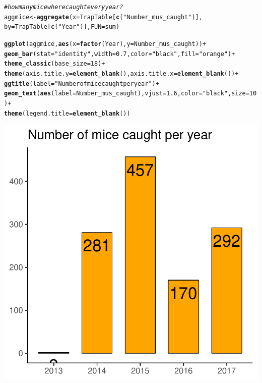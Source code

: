 \documentclass{article}\usepackage[]{graphicx}\usepackage[]{color}
\makeatletter
\newcommand{\hlnum}[1]{\textcolor[rgb]{0.686,0.059,0.569}{#1}}%
\newcommand{\hlstr}[1]{\textcolor[rgb]{0.192,0.494,0.8}{#1}}%
\newcommand{\hlcom}[1]{\textcolor[rgb]{0.678,0.584,0.686}{\textit{#1}}}%
\newcommand{\hlopt}[1]{\textcolor[rgb]{0,0,0}{#1}}%
\newcommand{\hlstd}[1]{\textcolor[rgb]{0.345,0.345,0.345}{#1}}%
\newcommand{\hlkwb}[1]{\textcolor[rgb]{0.69,0.353,0.396}{#1}}%
\newcommand{\hlkwc}[1]{\textcolor[rgb]{0.333,0.667,0.333}{#1}}%
\newcommand{\hlkwd}[1]{\textcolor[rgb]{0.737,0.353,0.396}{\textbf{#1}}}%
\newenvironment{kframe}{%
 \def\at@end@of@kframe{}%
 \ifinner\ifhmode%
  \def\at@end@of@kframe{\end{minipage}}%
  \begin{minipage}{\columnwidth}%
 \fi\fi%
 \def\FrameCommand##1{\hskip\@totalleftmargin \hskip-\fboxsep
 \colorbox{shadecolor}{##1}\hskip-\fboxsep
     \hskip-\linewidth \hskip-\@totalleftmargin \hskip\columnwidth}%
 \MakeFramed {\advance\hsize-\width
   \@totalleftmargin\z@ \linewidth\hsize
   \@setminipage}}%
 {\par\unskip\endMakeFramed%
 \at@end@of@kframe}
\newenvironment{knitrout}{}{} %
\makeatother
\begin{document}
\begin{knitrout}
{}


\begin{kframe}\begin{alltt}
\hlcom{# how many mice where caught every year?}
\hlstd{aggmice} \hlkwb{<-} \hlkwd{aggregate}\hlstd{(}\hlkwc{x} \hlstd{= TrapTable[}\hlkwd{c}\hlstd{(}\hlstr{"Number_mus_caught"}\hlstd{)],}
                     \hlkwc{by} \hlstd{= TrapTable[}\hlkwd{c}\hlstd{(}\hlstr{"Year"}\hlstd{)],} \hlkwc{FUN} \hlstd{= sum)}

\hlkwd{ggplot}\hlstd{(aggmice,} \hlkwd{aes}\hlstd{(}\hlkwc{x} \hlstd{=} \hlkwd{factor}\hlstd{(Year),} \hlkwc{y} \hlstd{= Number_mus_caught))}\hlopt{+}
  \hlkwd{geom_bar}\hlstd{(}\hlkwc{stat}\hlstd{=}\hlstr{"identity"}\hlstd{,} \hlkwc{width}\hlstd{=}\hlnum{0.7}\hlstd{,} \hlkwc{color}\hlstd{=}\hlstr{"black"}\hlstd{,} \hlkwc{fill} \hlstd{=} \hlstr{"orange"}\hlstd{)}\hlopt{+}
  \hlkwd{theme_classic}\hlstd{(}\hlkwc{base_size} \hlstd{=} \hlnum{18}\hlstd{)} \hlopt{+}
  \hlkwd{theme}\hlstd{(}\hlkwc{axis.title.y}\hlstd{=}\hlkwd{element_blank}\hlstd{(),} \hlkwc{axis.title.x}\hlstd{=}\hlkwd{element_blank}\hlstd{())} \hlopt{+}
  \hlkwd{ggtitle}\hlstd{(}\hlkwc{label} \hlstd{=} \hlstr{"Number of mice caught per year"}\hlstd{)} \hlopt{+}
  \hlkwd{geom_text}\hlstd{(}\hlkwd{aes}\hlstd{(}\hlkwc{label}\hlstd{=Number_mus_caught),} \hlkwc{vjust}\hlstd{=}\hlnum{1.6}\hlstd{,} \hlkwc{color}\hlstd{=}\hlstr{"black"}\hlstd{,} \hlkwc{size}\hlstd{=}\hlnum{10}\hlstd{)}\hlopt{+}
  \hlkwd{theme}\hlstd{(}\hlkwc{legend.title}\hlstd{=}\hlkwd{element_blank}\hlstd{())}
\end{alltt}
\end{kframe}

{\centering \includegraphics[width=.6\linewidth]{figure/Data-Analysis-Alice-2017-Rnwauto-report-3} 

}
\end{knitrout}
\end{document}
